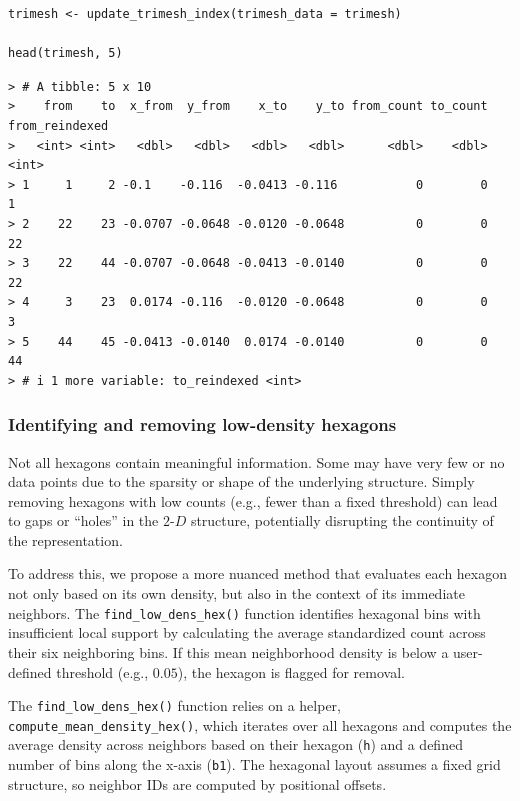 \begin{verbatim}
trimesh <- update_trimesh_index(trimesh_data = trimesh)

head(trimesh, 5)
\end{verbatim}

\begin{verbatim}
> # A tibble: 5 x 10
>    from    to  x_from  y_from    x_to    y_to from_count to_count from_reindexed
>   <int> <int>   <dbl>   <dbl>   <dbl>   <dbl>      <dbl>    <dbl>          <int>
> 1     1     2 -0.1    -0.116  -0.0413 -0.116           0        0              1
> 2    22    23 -0.0707 -0.0648 -0.0120 -0.0648          0        0             22
> 3    22    44 -0.0707 -0.0648 -0.0413 -0.0140          0        0             22
> 4     3    23  0.0174 -0.116  -0.0120 -0.0648          0        0              3
> 5    44    45 -0.0413 -0.0140  0.0174 -0.0140          0        0             44
> # i 1 more variable: to_reindexed <int>
\end{verbatim}

\subsubsection{Identifying and removing low-density hexagons}\label{identifying-and-removing-low-density-hexagons}

Not all hexagons contain meaningful information. Some may have very few or no data points due to the sparsity or shape of the underlying structure. Simply removing hexagons with low counts (e.g., fewer than a fixed threshold) can lead to gaps or ``holes'' in the \(2\text{-}D\) structure, potentially disrupting the continuity of the representation.

To address this, we propose a more nuanced method that evaluates each hexagon not only based on its own density, but also in the context of its immediate neighbors. The \texttt{find\_low\_dens\_hex()} function identifies hexagonal bins with insufficient local support by calculating the average standardized count across their six neighboring bins. If this mean neighborhood density is below a user-defined threshold (e.g., \(0.05\)), the hexagon is flagged for removal.

The \texttt{find\_low\_dens\_hex()} function relies on a helper, \texttt{compute\_mean\_density\_hex()}, which iterates over all hexagons and computes the average density across neighbors based on their hexagon (\texttt{h}) and a defined number of bins along the x-axis (\texttt{b1}). The hexagonal layout assumes a fixed grid structure, so neighbor IDs are computed by positional offsets.

